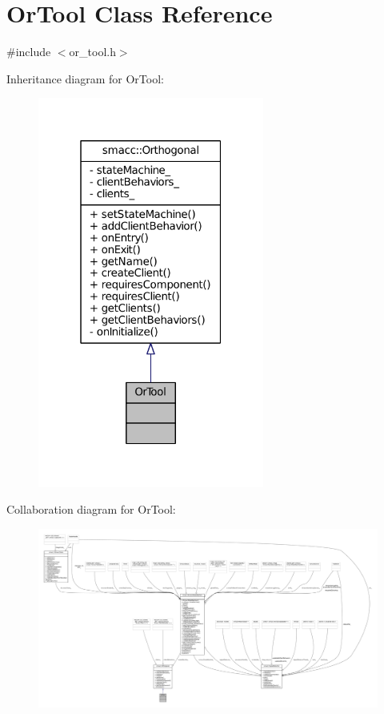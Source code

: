 \hypertarget{classOrTool}{}\section{Or\+Tool Class Reference}
\label{classOrTool}


{\ttfamily \#include $<$or\+\_\+tool.\+h$>$}



Inheritance diagram for Or\+Tool\+:
\nopagebreak
\begin{figure}[H]
\begin{center}
\leavevmode
\includegraphics[width=211pt]{classOrTool__inherit__graph}
\end{center}
\end{figure}


Collaboration diagram for Or\+Tool\+:
\nopagebreak
\begin{figure}[H]
\begin{center}
\leavevmode
\includegraphics[width=350pt]{classOrTool__coll__graph}
\end{center}
\end{figure}
